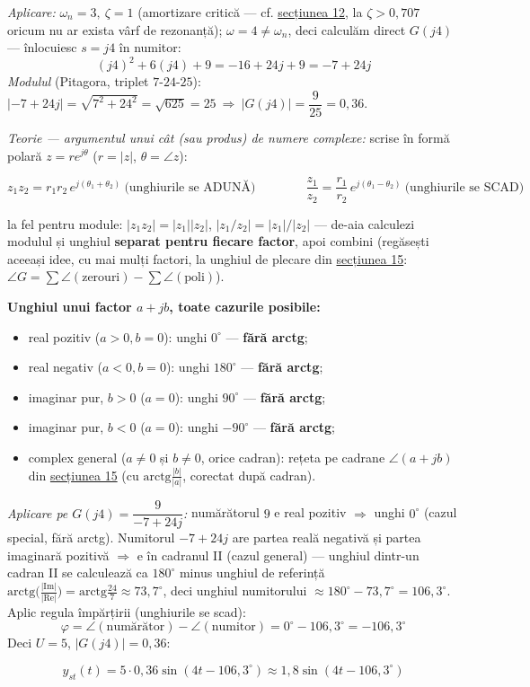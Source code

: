 \documentclass[10pt,a4paper]{article}
\begin{document}
\textit{Aplicare:} $\omega_n{=}3,\ \zeta{=}1$ (amortizare critică — cf. \hyperref[sec:12]{secțiunea 12}, la $\zeta{>}0{,}707$ oricum nu ar exista vârf de rezonanță); $\omega{=}4\ne\omega_n$, deci calculăm direct $G(j4)$ — înlocuiesc $s{=}j4$ în numitor:
$$(j4)^2+6(j4)+9=-16+24j+9=-7+24j$$
\textit{Modulul} (Pitagora, triplet $7$-$24$-$25$): $|{-}7{+}24j|=\sqrt{7^2{+}24^2}=\sqrt{625}=25\ \Rightarrow\ |G(j4)|=\dfrac9{25}=0{,}36$.

\textit{Teorie — argumentul unui cât (sau produs) de numere complexe:} scrise în formă polară $z=re^{j\theta}$ ($r{=}|z|$, $\theta{=}\angle z$):
\begin{keyeq}\color{red!65!black}
$$z_1z_2=r_1r_2\,e^{j(\theta_1+\theta_2)}\ \text{(unghiurile se ADUNĂ)}\qquad\qquad \dfrac{z_1}{z_2}=\dfrac{r_1}{r_2}\,e^{j(\theta_1-\theta_2)}\ \text{(unghiurile se SCAD)}$$
\end{keyeq}
la fel pentru module: $|z_1z_2|{=}|z_1||z_2|$, $|z_1/z_2|{=}|z_1|/|z_2|$ — de-aia calculezi modulul și unghiul \textbf{separat pentru fiecare factor}, apoi combini (regăsești aceeași idee, cu mai mulți factori, la unghiul de plecare din \hyperref[sec:15]{secțiunea 15}: $\angle G=\sum\angle(\text{zerouri})-\sum\angle(\text{poli})$).

\textbf{Unghiul unui factor $a{+}jb$, toate cazurile posibile:}
\begin{itemize}
\item real pozitiv ($a{>}0,b{=}0$): unghi $0^\circ$ — \textbf{fără arctg};
\item real negativ ($a{<}0,b{=}0$): unghi $180^\circ$ — \textbf{fără arctg};
\item imaginar pur, $b{>}0$ ($a{=}0$): unghi $90^\circ$ — \textbf{fără arctg};
\item imaginar pur, $b{<}0$ ($a{=}0$): unghi $-90^\circ$ — \textbf{fără arctg};
\item complex general ($a{\ne}0$ și $b{\ne}0$, orice cadran): rețeta pe cadrane $\angle(a{+}jb)$ din \hyperref[sec:15]{secțiunea 15} (cu $\mathrm{arctg}\tfrac{|b|}{|a|}$, corectat după cadran).
\end{itemize}

\textit{Aplicare pe $G(j4)=\dfrac9{-7+24j}$:} numărătorul $9$ e real pozitiv $\Rightarrow$ unghi $0^\circ$ (cazul special, fără arctg). Numitorul $-7{+}24j$ are partea reală negativă și partea imaginară pozitivă $\Rightarrow$ e în cadranul II (cazul general) — unghiul dintr-un cadran II se calculează ca $180^\circ$ minus unghiul de referință $\mathrm{arctg}\big(\tfrac{|\mathrm{Im}|}{|\mathrm{Re}|}\big)=\mathrm{arctg}\tfrac{24}7\approx73{,}7^\circ$, deci unghiul numitorului $\approx180^\circ-73{,}7^\circ=106{,}3^\circ$. Aplic regula împărțirii (unghiurile se scad):
$$\varphi=\angle(\text{numărător})-\angle(\text{numitor})=0^\circ-106{,}3^\circ=-106{,}3^\circ$$
Deci $U{=}5$, $|G(j4)|{=}0{,}36$:
\begin{keyeq}\color{red!65!black}
$$y_{st}(t)=5\cdot0{,}36\sin(4t-106{,}3^\circ)\approx1{,}8\sin(4t-106{,}3^\circ)$$
\end{keyeq}
\end{document}
